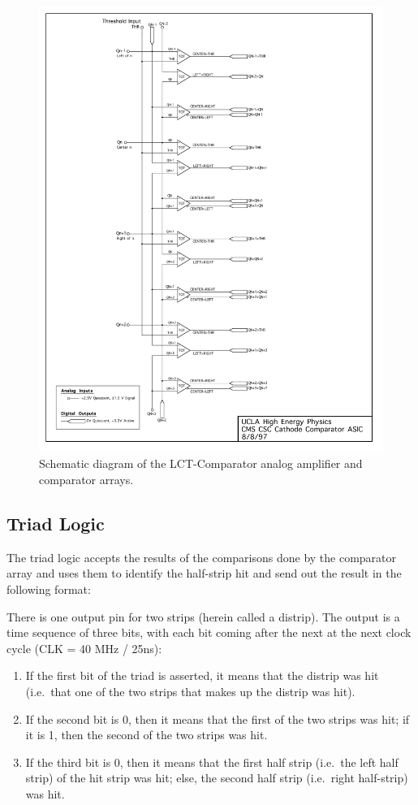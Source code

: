 \documentclass[letterpaper]{article}
\begin{document}
\begin{figure}[H]
\centering \includegraphics[keepaspectratio=true, width=0.9 \textwidth]{Images/synccompnodigital.pdf}
\caption{Schematic diagram of the LCT-Comparator analog amplifier and comparator arrays.}
\end{figure}

\subsection{Triad Logic}\label{sec:triad-logic}

The triad logic accepts the results of the comparisons done by the comparator array and uses them to identify the half-strip hit and send out the result in the following format:

There is one output pin for two strips (herein called a distrip). The output is a time sequence of three bits, with each bit coming after the next at the next clock cycle (CLK = 40 MHz / 25ns):

\begin{enumerate}
    \item If the first bit of the triad is asserted, it means that the distrip was hit (i.e.\ that one of the two strips that makes up the distrip was hit).
    \item If the second bit is 0, then it means that the first of the two strips was hit; if it is 1, then the second of the two strips was hit.
    \item If the third bit is 0, then it means that the first half strip (i.e.\ the left half strip) of the hit strip was hit; else, the second half strip (i.e.\ right half-strip) was hit.
\end{enumerate}
\end{document}
